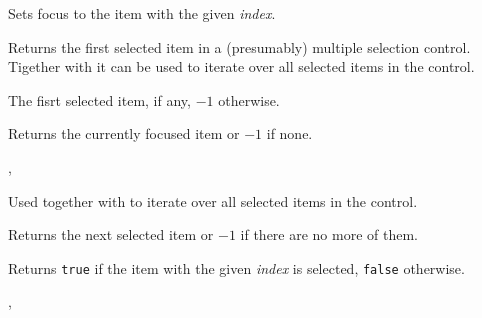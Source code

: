 

\label{wxlistviewfocus}


Sets focus to the item with the given {\it index}.


\label{wxlistviewgetfirstselected}


Returns the first selected item in a (presumably) multiple selection control.
Tigether with  it can be
used to iterate over all selected items in the control.


The fisrt selected item, if any, $-1$ otherwise.


\label{wxlistviewgetfocuseditem}


Returns the currently focused item or $-1$ if none.


,\\


\label{wxlistviewgetnextselected}


Used together with  to
iterate over all selected items in the control.


Returns the next selected item or $-1$ if there are no more of them.


\label{wxlistviewisselected}


Returns {\tt true} if the item with the given {\it index} is selected, 
{\tt false} otherwise.


,\\


